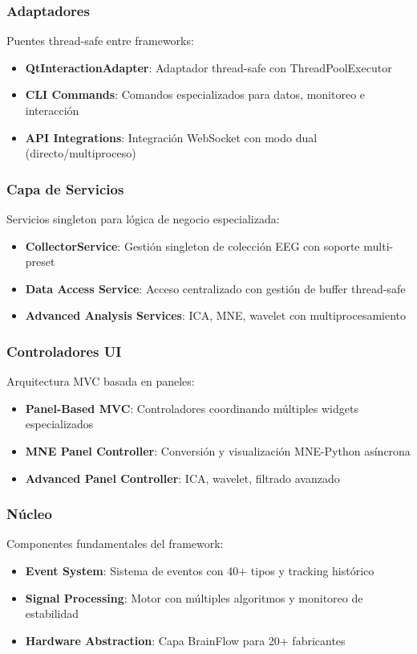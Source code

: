 \subsubsection{Adaptadores}
Puentes thread-safe entre frameworks:
\begin{itemize}
    \item \textbf{QtInteractionAdapter}: Adaptador thread-safe con ThreadPoolExecutor
    \item \textbf{CLI Commands}: Comandos especializados para datos, monitoreo e interacción
    \item \textbf{API Integrations}: Integración WebSocket con modo dual (directo/multiproceso)
\end{itemize}

\subsubsection{Capa de Servicios}
Servicios singleton para lógica de negocio especializada:
\begin{itemize}
    \item \textbf{CollectorService}: Gestión singleton de colección EEG con soporte multi-preset
    \item \textbf{Data Access Service}: Acceso centralizado con gestión de buffer thread-safe
    \item \textbf{Advanced Analysis Services}: ICA, MNE, wavelet con multiprocesamiento
\end{itemize}

\subsubsection{Controladores UI}
Arquitectura MVC basada en paneles:
\begin{itemize}
    \item \textbf{Panel-Based MVC}: Controladores coordinando múltiples widgets especializados
    \item \textbf{MNE Panel Controller}: Conversión y visualización MNE-Python asíncrona
    \item \textbf{Advanced Panel Controller}: ICA, wavelet, filtrado avanzado
\end{itemize}

\subsubsection{Núcleo}
Componentes fundamentales del framework:
\begin{itemize}
    \item \textbf{Event System}: Sistema de eventos con 40+ tipos y tracking histórico
    \item \textbf{Signal Processing}: Motor con múltiples algoritmos y monitoreo de estabilidad
    \item \textbf{Hardware Abstraction}: Capa BrainFlow para 20+ fabricantes
\end{itemize}

